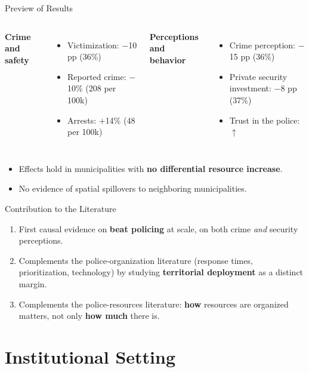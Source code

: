 \documentclass[11pt,aspectratio=169]{beamer}
\begin{document}
\begin{frame}{Preview of Results}
\begin{columns}[T]
\textbf{Crime and safety}
\begin{itemize}
\item Victimization: $-$10 pp (36\%)
\item Reported crime: $-$10\% (208 per 100k)
\item Arrests: $+$14\% (48 per 100k)
\end{itemize}
\textbf{Perceptions and behavior}
\begin{itemize}
\item Crime perception: $-$15 pp (36\%)
\item Private security investment: $-$8 pp (37\%)
\item Trust in the police: $\uparrow$
\end{itemize}
\end{columns}
\vspace{8pt}
\begin{itemize}
\item Effects hold in municipalities with \textbf{no differential resource increase}.
\item No evidence of spatial spillovers to neighboring municipalities.
\end{itemize}
\end{frame}

\begin{frame}{Contribution to the Literature}
\begin{enumerate}
\item First causal evidence on \textbf{beat policing} at scale, on both crime \emph{and} security perceptions.
\item Complements the police-organization literature (response times, prioritization, technology) by studying \textbf{territorial deployment} as a distinct margin.
\item Complements the police-resources literature: \textbf{how} resources are organized matters, not only \textbf{how much} there is.
\end{enumerate}
\end{frame}

\section{Institutional Setting}
\end{document}
